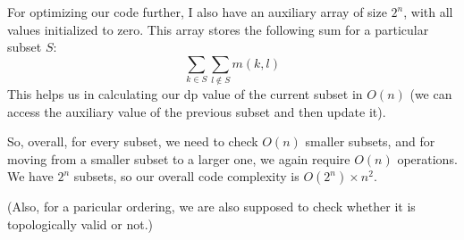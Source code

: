 \documentclass[a4paper,12pt]{article}
\begin{document}
For optimizing our code further, I also have an auxiliary array of size $2^n$, with all values initialized to zero. This array stores the following sum for a particular subset $S$:
\[
  \sum_{k \in S}\sum_{l \notin S} m(k,l)  
\]
This helps us in calculating our dp value of the current subset in $O(n)$ (we can access the auxiliary value of the previous subset and then update it).


So, overall, for every subset, we need to check $O(n)$ smaller subsets, and for moving from a smaller subset to a larger one, we again require $O(n)$ operations. We have $2^n$ subsets, so our overall code complexity is $O(2^n)\times n^2$.

(Also, for a paricular ordering, we are also supposed to check whether it is topologically valid or not.)
\end{document}
